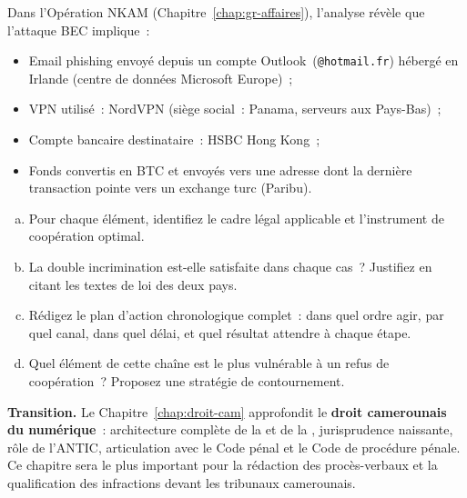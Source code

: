 \begin{boxexo}[title={\ding{45}\quad Exercice~11.3. Stratégie juridique complète \niveauexpert}]
Dans l'Opération NKAM (Chapitre~\ref{chap:gr-affaires}), l'analyse
révèle que l'attaque BEC implique~:
\begin{itemize}
    \item Email phishing envoyé depuis un compte Outlook~(\texttt{@hotmail.fr})
          hébergé en Irlande (centre de données Microsoft Europe)~;
    \item VPN utilisé~: NordVPN (siège social~: Panama, serveurs
          aux Pays-Bas)~;
    \item Compte bancaire destinataire~: HSBC Hong Kong~;
    \item Fonds convertis en BTC et envoyés vers une adresse dont la
          dernière transaction pointe vers un exchange turc (Paribu).
\end{itemize}
\begin{enumerate}[(a)]
    \item Pour chaque élément, identifiez le cadre légal applicable et
          l'instrument de coopération optimal.
    \item La double incrimination est-elle satisfaite dans chaque cas~?
          Justifiez en citant les textes de loi des deux pays.
    \item Rédigez le plan d'action chronologique complet~: dans quel
          ordre agir, par quel canal, dans quel délai, et quel résultat
          attendre à chaque étape.
    \item Quel élément de cette chaîne est le plus vulnérable à un
          refus de coopération~? Proposez une stratégie de contournement.
\end{enumerate}
\end{boxexo}

\bigskip

\begin{boxinfo}
\textbf{Transition.} Le Chapitre~\ref{chap:droit-cam} approfondit le
\textbf{droit camerounais du numérique}~: architecture complète de
la  et de la , jurisprudence naissante,
rôle de l'ANTIC, articulation avec le Code pénal et le Code de procédure
pénale. Ce chapitre sera le plus important pour la rédaction des
procès-verbaux et la qualification des infractions devant les tribunaux
camerounais.
\end{boxinfo}
